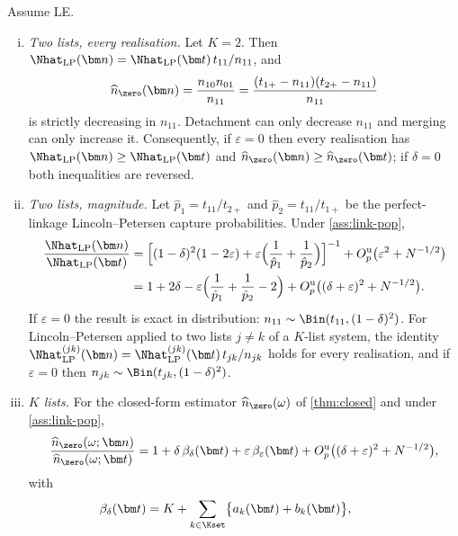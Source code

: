 \begin{theorem}\label{thm:linkbias}
Assume LE.
\begin{enumerate}[(i)]
  \item \emph{Two lists, every realisation.} Let $K=2$. Then $\Nhat_{\mathrm{LP}}(\bm n)=\Nhat_{\mathrm{LP}}(\bm t)\,t_{11}/n_{11}$, and
  \[
    \widehat n_{\zero}(\bm n)=\frac{n_{10}n_{01}}{n_{11}}=\frac{(t_{1+}-n_{11})(t_{2+}-n_{11})}{n_{11}}
  \]
  is strictly decreasing in $n_{11}$. Detachment can only decrease $n_{11}$ and merging can only increase it. Consequently, if $\varepsilon=0$ then every realisation has $\Nhat_{\mathrm{LP}}(\bm n)\ge\Nhat_{\mathrm{LP}}(\bm t)$ and $\widehat n_{\zero}(\bm n)\ge\widehat n_{\zero}(\bm t)$; if $\delta=0$ both inequalities are reversed.
  \item \emph{Two lists, magnitude.} Let $\hat p_1=t_{11}/t_{2+}$ and $\hat p_2=t_{11}/t_{1+}$ be the perfect-linkage Lincoln--Petersen capture probabilities. Under \cref{ass:link-pop},
  \begin{align}
    \frac{\Nhat_{\mathrm{LP}}(\bm n)}{\Nhat_{\mathrm{LP}}(\bm t)}
    &=\Bigl[(1-\delta)^2(1-2\varepsilon)+\varepsilon\Bigl(\frac1{\hat p_1}+\frac1{\hat p_2}\Bigr)\Bigr]^{-1}+O_p^{\mathrm u}\bigl(\varepsilon^2+N^{-1/2}\bigr)\notag\\
    &=1+2\delta-\varepsilon\Bigl(\frac1{\hat p_1}+\frac1{\hat p_2}-2\Bigr)+O_p^{\mathrm u}\bigl((\delta+\varepsilon)^2+N^{-1/2}\bigr).\label{eq:link-LP}
  \end{align}
  If $\varepsilon=0$ the result is exact in distribution: $n_{11}\sim\Bin(t_{11},(1-\delta)^2)$. For Lincoln--Petersen applied to two lists $j\ne k$ of a $K$-list system, the identity $\Nhat^{(jk)}_{\mathrm{LP}}(\bm n)=\Nhat^{(jk)}_{\mathrm{LP}}(\bm t)\,t_{jk}/n_{jk}$ holds for every realisation, and if $\varepsilon=0$ then $n_{jk}\sim\Bin(t_{jk},(1-\delta)^2)$.
  \item \emph{$K$ lists.} For the closed-form estimator $\widehat n_{\zero}(\omega)$ of \cref{thm:closed} and under \cref{ass:link-pop},
  \begin{equation}\label{eq:link-Kbias}
    \frac{\widehat n_{\zero}(\omega;\bm n)}{\widehat n_{\zero}(\omega;\bm t)}=1+\delta\,\beta_\delta(\bm t)+\varepsilon\,\beta_\varepsilon(\bm t)+O_p^{\mathrm u}\bigl((\delta+\varepsilon)^2+N^{-1/2}\bigr),
  \end{equation}
  with
  \begin{align}
    \beta_\delta(\bm t)&=K+\sum_{k\in\Kset}\bigl\{a_k(\bm t)+b_k(\bm t)\bigr\},\qquad

\end{align}
\end{enumerate}
\end{theorem}
